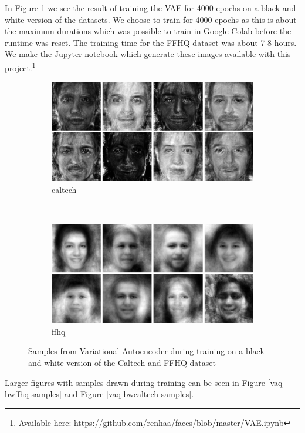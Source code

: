 In Figure \ref{vaeresults} we see the result of training the VAE for 4000 epochs on a black and white version of the datasets. We choose to train for 4000 epochs as this is about the maximum durations which was possible to train in Google Colab before the runtime was reset. The training time for the FFHQ dataset was about 7-8 hours. We make the Jupyter notebook which generate these images available with this project.\footnote{Available here: \url{ https://github.com/renhaa/faces/blob/master/VAE.ipynb}}

\begin{figure}[h!]
\centering
\begin{subfigure}[b]{0.45\textwidth}
     \includegraphics[width=\textwidth]{fig/vae/caltech_epoch4000}
    \caption{caltech}
\end{subfigure}
    ~
\begin{subfigure}[b]{0.45\textwidth}
     \includegraphics[width=\textwidth]{fig/vae/ffhq_epoch4000}
    \caption{ffhq}
\end{subfigure}
\caption{Samples from Variational Autoencoder during training on a black and white version of the Caltech and FFHQ dataset}
\label{vaeresults}
\end{figure}

Larger figures with samples drawn during training can be seen in Figure \ref{vaq-bwffhq-samples} and Figure \ref{vaq-bwcaltech-samples}.

